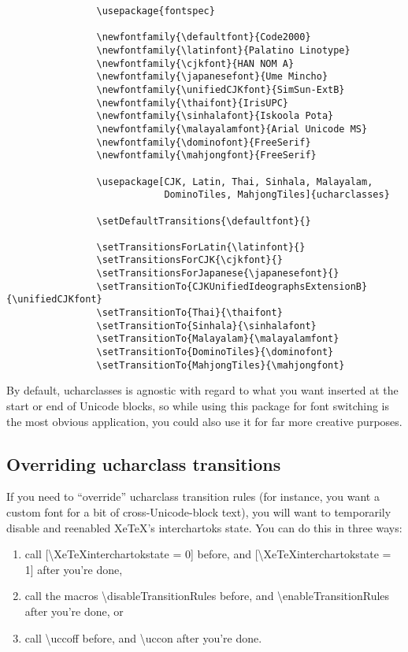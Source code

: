﻿\documentclass{article}
\newenvironment{numberlist}{%
  \begin{enumerate}
	\setlength{\itemsep}{0pt}
	\setlength{\parsep}{0pt}
	\setlength{\topsep}{0pt}
	\setlength{\partopsep}{0pt}
	\setlength{\parskip}{0pt}
	\setlength{\labelsep}{5pt}}%
{
  \end{enumerate}}
\begin{document}
		\disableTransitionRules
		\begin{verbatim}
				\usepackage{fontspec}

				\newfontfamily{\defaultfont}{Code2000}
				\newfontfamily{\latinfont}{Palatino Linotype}
				\newfontfamily{\cjkfont}{HAN NOM A}
				\newfontfamily{\japanesefont}{Ume Mincho}
				\newfontfamily{\unifiedCJKfont}{SimSun-ExtB}
				\newfontfamily{\thaifont}{IrisUPC}
				\newfontfamily{\sinhalafont}{Iskoola Pota}
				\newfontfamily{\malayalamfont}{Arial Unicode MS}
				\newfontfamily{\dominofont}{FreeSerif}
				\newfontfamily{\mahjongfont}{FreeSerif}

				\usepackage[CJK, Latin, Thai, Sinhala, Malayalam,
				            DominoTiles, MahjongTiles]{ucharclasses}

				\setDefaultTransitions{\defaultfont}{}

				\setTransitionsForLatin{\latinfont}{}
				\setTransitionsForCJK{\cjkfont}{}
				\setTransitionsForJapanese{\japanesefont}{}
				\setTransitionTo{CJKUnifiedIdeographsExtensionB}{\unifiedCJKfont}
				\setTransitionTo{Thai}{\thaifont}
				\setTransitionTo{Sinhala}{\sinhalafont}
				\setTransitionTo{Malayalam}{\malayalamfont}
				\setTransitionTo{DominoTiles}{\dominofont}
				\setTransitionTo{MahjongTiles}{\mahjongfont}
		\end{verbatim}
		\enableTransitionRules

		By default, ucharclasses is agnostic with regard to what you want inserted at the start or end of Unicode blocks, so while using this package for font switching is the most obvious application, you could also use it for far more creative purposes.

		\subsection{Overriding ucharclass transitions}

			If you need to “override” ucharclass transition rules (for instance, you want a custom font for a bit of cross-Unicode-block text), you will want to temporarily disable and reenabled XeTeX's interchartoks state. You can do this in three ways:

			\begin{numberlist}
				\item call [\textbackslash XeTeXinterchartokstate = 0] before, and [\textbackslash XeTeXinterchartokstate = 1] after you're done,
				\item call the macros \textbackslash disableTransitionRules before, and \textbackslash enableTransitionRules after you're done, or
				\item call \textbackslash uccoff before, and \textbackslash uccon after you're done.
			\end{numberlist}
\end{document}
